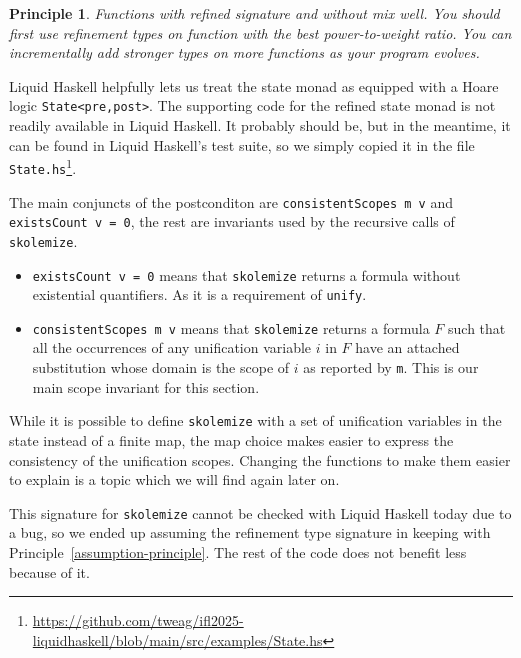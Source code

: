 \documentclass[sigconf]{acmart}
\newcommand{\tc}[1]{{\small\texttt{#1}}}
\newcommand{\sourcefile}[1]{\tc{#1}\footnote{\scriptsize\url{https://github.com/tweag/ifl2025-liquidhaskell/blob/main/src/examples/#1}}}
\newtheorem{principle}{Principle}
\begin{document}
\begin{principle}
  Functions with refined signature and without mix well. You should first use
  refinement types on function with the best power-to-weight ratio. You can
  incrementally add stronger types on more functions as your program evolves.
\end{principle}

Liquid Haskell helpfully lets us treat the state monad as equipped with
a Hoare logic \tc{State<pre,post>}. The supporting code for the refined state
monad is not readily available in Liquid Haskell. It probably should be, but in
the meantime, it can be found in Liquid Haskell's test suite, so we simply
copied it in the file \sourcefile{State.hs}.

The main conjuncts of the postconditon are \tc{consistent\-Scopes m v} and
\tc{existsCount v = 0}, the rest are invariants used by the recursive calls of
\tc{skolemize}.
\begin{itemize}
  \item \tc{existsCount v = 0} means that \tc{skolemize} returns a formula without
  existential quantifiers. As it is a requirement of \tc{unify}.
  \item \tc{consistentScopes m v} means that \tc{skolemize} returns a
  formula $F$ such that all the occurrences of any unification variable $i$ in $F$
  have an attached substitution whose domain is the scope of $i$ as reported by \tc{m}. This is our main scope invariant for this
  section.
\end{itemize}

While it is possible to define \tc{skolemize} with a set of unification variables
in the state instead of a finite map, the map choice makes easier to express the
consistency of the unification scopes. Changing the functions to make them easier
to explain is a topic which we will find again later on.

This signature for \tc{skolemize} cannot be checked with Liquid Haskell today
due to
a bug, so we ended up assuming the refinement type signature
in keeping with Principle~\ref{assumption-principle}. The rest
of the code does not benefit less because of it.

\end{document}
